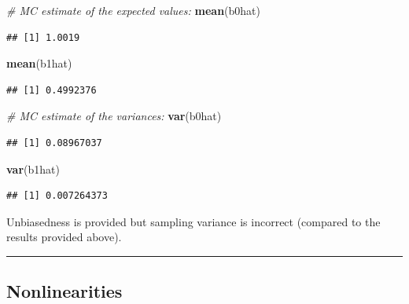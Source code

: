 \documentclass[]{book}
\newenvironment{Shaded}{\begin{snugshade}}{\end{snugshade}}
\newcommand{\CommentTok}[1]{\textcolor[rgb]{0.56,0.35,0.01}{\textit{#1}}}
\newcommand{\KeywordTok}[1]{\textcolor[rgb]{0.13,0.29,0.53}{\textbf{#1}}}
\newcommand{\NormalTok}[1]{#1}
\begin{document}
\begin{Shaded}
\begin{Highlighting}[]
\CommentTok{# MC estimate of the expected values:}
\KeywordTok{mean}\NormalTok{(b0hat)}
\end{Highlighting}
\end{Shaded}

\begin{verbatim}
## [1] 1.0019
\end{verbatim}

\begin{Shaded}
\begin{Highlighting}[]
\KeywordTok{mean}\NormalTok{(b1hat)}
\end{Highlighting}
\end{Shaded}

\begin{verbatim}
## [1] 0.4992376
\end{verbatim}

\begin{Shaded}
\begin{Highlighting}[]
\CommentTok{# MC estimate of the variances:}
\KeywordTok{var}\NormalTok{(b0hat)}
\end{Highlighting}
\end{Shaded}

\begin{verbatim}
## [1] 0.08967037
\end{verbatim}

\begin{Shaded}
\begin{Highlighting}[]
\KeywordTok{var}\NormalTok{(b1hat)}
\end{Highlighting}
\end{Shaded}

\begin{verbatim}
## [1] 0.007264373
\end{verbatim}

Unbiasedness is provided but sampling variance is incorrect (compared to
the results provided above).

\begin{center}\rule{0.5\linewidth}{\linethickness}\end{center}

\hypertarget{nonlinearities}{%
\subsection{Nonlinearities}\label{nonlinearities}}
\end{document}
